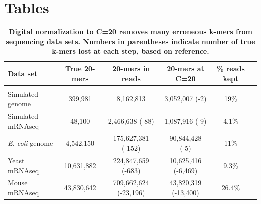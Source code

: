 


\section{Tables}

\begin{table}[!ht]
\caption{
\bf{Digital normalization to C=20 removes many erroneous k-mers from sequencing data sets.  Numbers
in parentheses indicate number of true k-mers lost at each step, based on reference.}}
\begin{tabular}{|l|c|c|c|c|c|}
Data set & True 20-mers & 20-mers in reads & 20-mers at C=20 & \% reads kept\\
\hline \\
Simulated genome & 399,981 & 8,162,813 & 3,052,007 (-2) & 19\% \\
Simulated mRNAseq & 48,100 & 2,466,638 (-88) & 1,087,916 (-9) & 4.1\% \\
{\em E. coli} genome & 4,542,150 & 175,627,381 (-152) & 90,844,428 (-5) & 11\% \\
Yeast mRNAseq & 10,631,882 & 224,847,659 (-683) & 10,625,416 (-6,469) & 9.3\% \\
Mouse mRNAseq & 43,830,642 & 709,662,624 (-23,196) & 43,820,319 (-13,400) & 26.4\% \\
\end{tabular}
\begin{flushleft}
\end{flushleft}
\label{tab:normC20}
\end{table}

